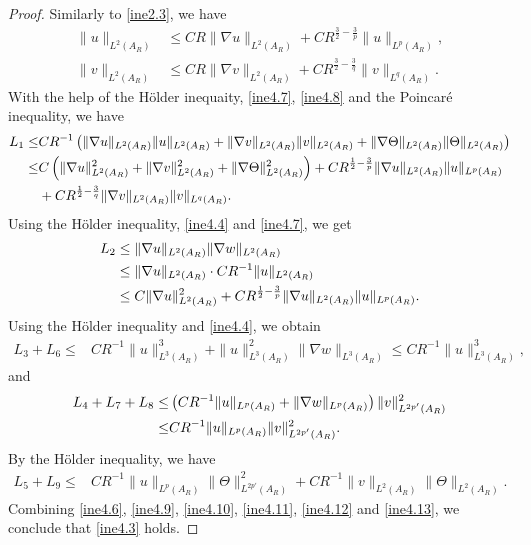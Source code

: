 \documentclass[11pt,reqno]{amsart}
\numberwithin{Thm}{section}
\begin{document}
\begin{proof}
Similarly to \eqref{ine2.3}, we have
	\begin{align}
		\|u\|_{L^2(A_R)}&\leq CR\|\nabla u\|_{L^2 (A_R)}+CR^{\frac{3}{2}-\frac{3}{p}}\|u\|_{L^p(A_R)},\label{ine4.7}\\
        \|v\|_{L^2(A_R)}&\leq CR\|\nabla v\|_{L^2 (A_R)}+CR^{\frac{3}{2}-\frac{3}{q}}\|v\|_{L^q(A_R)}.\label{ine4.8}
	\end{align}
With the help of the H\"{o}lder inequaity, \eqref{ine4.7}, \eqref{ine4.8} and the Poincar\'{e} inequality, we have
	\begin{align}\label{ine4.9}
		L_1\leq& CR^{-1}\left(\|\nabla u\|_{L^2 (A_R)}\|u\|_{L^2 (A_R)}+\|\nabla v\|_{L^2(A_R)}\|v\|_{L^2(A_R)}+\|\nabla \Theta\|_{L^2 (A_R)}\|\Theta\|_{L^2 (A_R)}\right)\notag\\
        \leq& C\left(\|\nabla u\|_{L^2 (A_R)}^2+\|\nabla v\|_{L^2 (A_R)}^2+\|\nabla \Theta\|_{L^2 (A_R)}^2\right)+CR^{\frac{1}{2}-\frac{3}{p}}\|\nabla u\|_{L^2 (A_R)}\|u\|_{L^p(A_R)}\\
        &+CR^{\frac{1}{2}-\frac{3}{q}}\|\nabla v\|_{L^2 (A_R)}\|v\|_{L^q(A_R)}.\notag
	\end{align}
	Using the H\"{o}lder inequality, \eqref{ine4.4} and \eqref{ine4.7}, we get
	\begin{align}\label{ine4.10}
		L_2&\leq\|\nabla u\|_{L^2(A_R)}\|\nabla w\|_{L^2(A_R)}\notag\\
		&\leq \|\nabla u\|_{L^2(A_R)}\cdot CR^{-1}\|u\|_{L^2(A_R)}\\
		&\leq C\|\nabla u\|_{L^2(A_R)}^2+CR^{\frac{1}{2}-\frac{3}{p}}\|\nabla u\|_{L^2 (A_R)}\|u\|_{L^p(A_R)}.\notag
	\end{align}
	Using the H\"{o}lder inequality and \eqref{ine4.4}, we obtain
	\begin{align}\label{ine4.11}
		L_3+L_6\leq& CR^{-1}\|u\|_{L^3(A_R)}^3+\|u\|_{L^3(A_R)}^2\|\nabla w\|_{L^3(A_R)}\leq CR^{-1}\|u\|_{L^3(A_R)}^3,
	\end{align}
and
	\begin{align}\label{ine4.12}
		L_4+L_7+L_8\leq& \left(CR^{-1}\|u\|_{L^p(A_R)}+\|\nabla w\|_{L^{p}(A_R)}\right)\|v\|_{L^{2p'}(A_R)}^2\notag\\
        \leq& CR^{-1}\|u\|_{L^p(A_R)}\|v\|_{L^{2p'}(A_R)}^2.
	\end{align}
By the H\"{o}lder inequality, we have
	\begin{align}\label{ine4.13}
		L_5+L_9\leq& CR^{-1}\|u\|_{L^p(A_R)}\|\Theta\|_{L^{2p'}(A_R)}^2+CR^{-1}\|v\|_{L^2(A_R)}\|\Theta\|_{L^2(A_R)}.
	\end{align}
Combining \eqref{ine4.6}, \eqref{ine4.9}, \eqref{ine4.10}, \eqref{ine4.11}, \eqref{ine4.12} and \eqref{ine4.13}, we conclude that \eqref{ine4.3} holds.
\end{proof}
\end{document}
